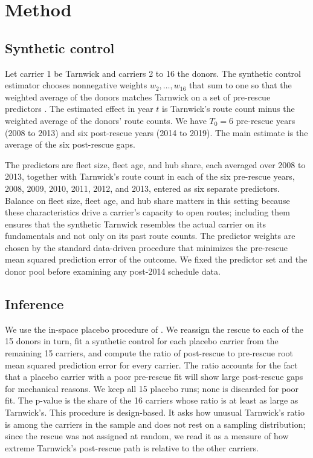 \documentclass[12pt]{article}
\begin{document}
\section{Method}

\subsection{Synthetic control}

Let carrier 1 be Tarnwick and carriers 2 to 16 the donors. The synthetic control estimator chooses nonnegative weights $w_2, \dots, w_{16}$ that sum to one so that the weighted average of the donors matches Tarnwick on a set of pre-rescue predictors \citep{abadie2010}. The estimated effect in year $t$ is Tarnwick's route count minus the weighted average of the donors' route counts. We have $T_0 = 6$ pre-rescue years (2008 to 2013) and six post-rescue years (2014 to 2019). The main estimate is the average of the six post-rescue gaps.

The predictors are fleet size, fleet age, and hub share, each averaged over 2008 to 2013, together with Tarnwick's route count in each of the six pre-rescue years, 2008, 2009, 2010, 2011, 2012, and 2013, entered as six separate predictors. Balance on fleet size, fleet age, and hub share matters in this setting because these characteristics drive a carrier's capacity to open routes; including them ensures that the synthetic Tarnwick resembles the actual carrier on its fundamentals and not only on its past route counts. The predictor weights are chosen by the standard data-driven procedure that minimizes the pre-rescue mean squared prediction error of the outcome. We fixed the predictor set and the donor pool before examining any post-2014 schedule data.

\subsection{Inference}

We use the in-space placebo procedure of \citet{abadie2010}. We reassign the rescue to each of the 15 donors in turn, fit a synthetic control for each placebo carrier from the remaining 15 carriers, and compute the ratio of post-rescue to pre-rescue root mean squared prediction error for every carrier. The ratio accounts for the fact that a placebo carrier with a poor pre-rescue fit will show large post-rescue gaps for mechanical reasons. We keep all 15 placebo runs; none is discarded for poor fit. The p-value is the share of the 16 carriers whose ratio is at least as large as Tarnwick's. This procedure is design-based. It asks how unusual Tarnwick's ratio is among the carriers in the sample and does not rest on a sampling distribution; since the rescue was not assigned at random, we read it as a measure of how extreme Tarnwick's post-rescue path is relative to the other carriers.
\end{document}
